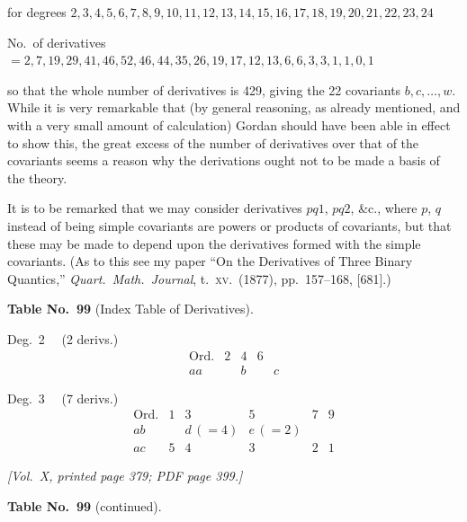 \documentclass[11pt]{article}
\begin{document}
\medskip

\noindent for degrees \quad $2, 3, 4, 5, 6, 7, 8, 9, 10, 11, 12, 13, 14, 15, 16, 17, 18, 19, 20, 21, 22, 23, 24$

\noindent No.~of derivatives $=2, 7, 19, 29, 41, 46, 52, 46, 44, 35, 26, 19, 17, 12, 13, 6, 6, 3, 3, 1, 1, 0, 1$

\medskip

so that the whole number of derivatives is 429, giving the 22 covariants $b, c, \ldots, w$. While it is very remarkable that (by general reasoning, as already mentioned, and with a very small amount of calculation) Gordan should have been able in effect to show this, the great excess of the number of derivatives over that of the covariants seems a reason why the derivations ought not to be made a basis of the theory.

\medskip

It is to be remarked that we may consider derivatives $pq1$, $pq2$, \&c., where $p$, $q$ instead of being simple covariants are powers or products of covariants, but that these may be made to depend upon the derivatives formed with the simple covariants. (As to this see my paper ``On the Derivatives of Three Binary Quantics,'' \emph{Quart.\ Math.\ Journal}, t.~\textsc{xv}.\ (1877), pp.~157--168, [681].)

\bigskip

\begin{center}
\textbf{Table No.~99} (Index Table of Derivatives).
\end{center}

\medskip

\noindent Deg.\ 2 \ \ (2 derivs.)
\[
\begin{array}{l|cccc}
\text{Ord.} & 2 & 4 & 6 & \\\hline
aa & & b & & c
\end{array}
\]

\noindent Deg.\ 3 \ \ (7 derivs.)
\[
\begin{array}{l|cccccc}
\text{Ord.} & 1 & 3 & 5 & 7 & 9 \\\hline
ab & & d\,(=4) & e\,(=2) & & \\
ac & 5 & 4 & 3 & 2 & 1
\end{array}
\]

\newpage

\noindent\textit{[Vol.~X, printed page 379; PDF page 399.]}

\begin{center}
\textbf{Table No.~99} (continued).
\end{center}
\end{document}
